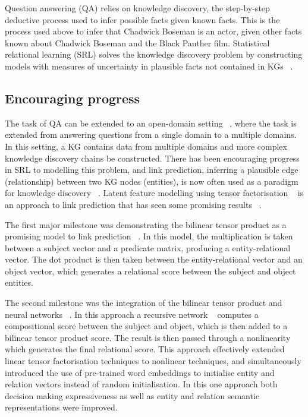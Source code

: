 \noindent Question answering (QA) relies on knowledge discovery, the step-by-step deductive process used to infer possible facts given known facts. This is the process used above to infer that Chadwick Boseman is an actor, given other facts known about Chadwick Boseman and the Black Panther film. Statistical relational learning (SRL) solves the knowledge discovery problem by constructing models with measures of uncertainty in plausible facts not contained in KGs \unskip~\citep{koller2007introduction}.\par

\subsection{Encouraging progress} 

The task of QA can be extended to an open-domain setting \unskip~\citep{chen2017reading}, where the task is extended from answering questions from a single domain to a multiple domains. In this setting, a KG contains data from multiple domains and more complex knowledge discovery chains be constructed. There has been encouraging progress in SRL to modelling this problem, and link prediction, inferring a plausible edge (relationship) between two KG nodes (entities), is now often used as a paradigm for knowledge discovery \unskip~\citep{kristiadi2019incorporating, ebisu2018toruse, nguyen2017novel}. Latent feature modelling using tensor factorisation \unskip~\citep{harshman1978models, kolda2009tensor} is an approach to link prediction that has seen some promising results \unskip~\citep{bordes2011learning, jenatton2012latent, nickel2016holographic}. \par 

\noindent The first major milestone was demonstrating the bilinear tensor product as a promising model to link prediction \unskip~\citep{nickel2011three}. In this model, the multiplication is taken between a subject vector and a predicate matrix, producing a entity-relational vector. The dot product is then taken between the entity-relational vector and an object vector, which generates a relational score between the subject and object entities. \par

\noindent The second milestone was the integration of the bilinear tensor product and neural networks \unskip~\citep{socher2013reasoning}. In this approach a recursive network \unskip~\citep{pollack1990recursive} computes a compositional score between the subject and object, which is then added to a bilinear tensor product score. The result is then passed through a nonlinearity which generates the final relational score. This approach effectively extended linear tensor factorisation techniques to nonlinear techniques, and simultaneously introduced the use of pre-trained word embeddings to initialise entity and relation vectors instead of random initialisation. In this one approach both decision making expressiveness as well as entity and relation semantic representations were improved. \par

